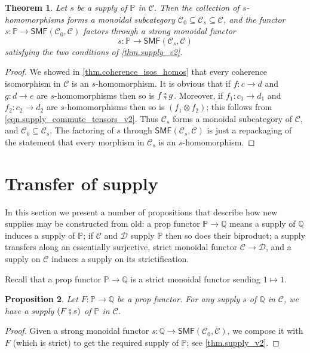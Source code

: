 \documentclass[11pt, oneside, article]{memoir}
\theoremstyle{plain}
\newtheorem{theorem}{Theorem}[chapter]
\newtheorem{proposition}[theorem]{Proposition}
\theoremstyle{definition}
\theoremstyle{remark}
\newcommand{\cat}[1]{\mathcal{#1}}%
\newcommand{\Cat}[1]{{\mathsf{#1}}}%
\newcommand{\smf}{\Cat{SMF}}
\newcommand{\pp}{\mathbb{P}}
\newcommand{\qq}{\mathbb{Q}}
\newcommand{\mob}[1]{#1_0}
\newcommand{\cp}{\mathbin{\fatsemi}}
\renewcommand{\ss}{\subseteq}
\begin{document}
\begin{theorem}\label{thm.homos_form_subcat}
Let $s$ be a supply of $\pp$ in $\cat{C}$. Then the collection of $s$-homomorphisms forms a monoidal subcategory $\mob{\cat{C}}\ss\cat{C}_s\ss\cat{C}$, and the functor $s\colon\pp\to\smf(\mob{\cat{C}},\cat{C})$ factors through a strong monoidal functor
\[s\colon\pp\to\smf(\cat{C}_s,\cat{C})\]
satisfying the two conditions of \cref{thm.supply_v2}.
\end{theorem}
\begin{proof}
We showed in \cref{thm.coherence_isos_homos} that every coherence isomorphism in $\cat{C}$ is an $s$-homomorphism. It is obvious that if $f\colon c\to d$ and $g\colon d\to e$ are $s$-homomorphisms then so is $f\cp g$. Moreover, if $f_1\colon c_1\to d_1$ and $f_2\colon c_2\to d_2$ are $s$-homomorphisms then so is $(f_1\otimes f_2)$; this follows from \cref{eqn.supply_commute_tensors_v2}. Thus $\cat{C}_s$ forms a monoidal subcategory of $\cat{C}$, and $\mob{\cat{C}}\ss\cat{C}_s$. The factoring of $s$ through $\smf(\cat{C}_s,\cat{C})$ is just a repackaging of the statement that every morphism in $\cat{C}_s$ is an $s$-homomorphism. 
\end{proof}

\section{Transfer of supply}\label{sec.further_theory}

In this section we present a number of propositions that describe how new supplies may be constructed from old: a prop functor $\pp \to \qq$ means a supply of $\qq$ induces a supply of $\pp$; if $\cat{C}$ and $\cat{D}$ supply $\pp$ then so does their biproduct; a supply transfers along an essentially surjective, strict monoidal functor $\cat{C} \to \cat{D}$, and a supply on $\cat{C}$ induces a supply on its strictification.

Recall that a prop functor $\pp\to\qq$ is a strict monoidal functor sending $1\mapsto 1$.

\begin{proposition}\label{cor.change_of_supply}
Let $F\colon\pp\to\qq$ be a prop functor. For any supply $s$ of $\qq$ in $\cat{C}$, we have a supply $(F\cp s)$ of $\pp$ in $\cat{C}$.
\end{proposition}
\begin{proof}
Given a strong monoidal functor $s\colon\qq\to\smf(\mob{\cat{C}},\cat{C})$, we compose it with $F$ (which is strict) to get the required supply of $\pp$; see \cref{thm.supply_v2}.
\end{proof}
\end{document}
